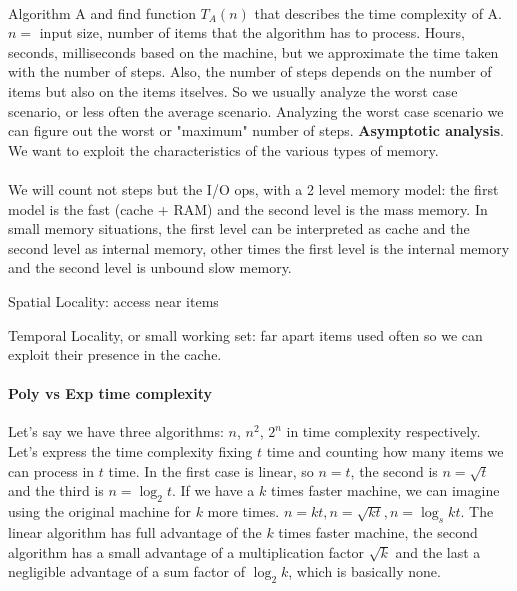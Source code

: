 \documentclass[10pt]{report}
\begin{document}
\paragraph{} Algorithm A and find function $T_A(n)$ that describes the time complexity of A. $n = $ input size, number of items that the algorithm has to process. Hours, seconds, milliseconds based on the machine, but we approximate the time taken with the number of steps. Also, the number of steps depends on the number of items but also on the items itselves. So we usually analyze the worst case scenario, or less often the average scenario. Analyzing the worst case scenario we can figure out the worst or "maximum" number of steps. \textbf{Asymptotic analysis}.\\
We want to exploit the characteristics of the various types of memory.\\\\
We will count not steps but the I/O ops, with a 2 level memory model: the first model is the fast (cache + RAM) and the second level is the mass memory. In small memory situations, the first level can be interpreted as cache and the second level as internal memory, other times the first level is the internal memory and the second level is unbound slow memory.
\begin{list}{}{}
	\item Spatial Locality: access near items
	\item Temporal Locality, or small working set: far apart items used often so we can exploit their presence in the cache.
\end{list}
\paragraph{Poly vs Exp time complexity} Let's say we have three algorithms: $n$, $n^2$, $2^n$ in time complexity respectively. Let's express the time complexity fixing $t$ time and counting how many items we can process in $t$ time. In the first case is linear, so $n = t$, the second is $n = \sqrt{t}$ and the third is $n = \log_2 t$. If we have a $k$ times faster machine, we can imagine using the original machine for $k$ more times. $n = kt, n = \sqrt{kt}, n = \log_s kt$. The linear algorithm has full advantage of the $k$ times faster machine, the second algorithm has a small advantage of a multiplication factor $\sqrt{k}$ and the last a negligible advantage of a sum factor of $\log_2 k$, which is basically none.
\end{document}
